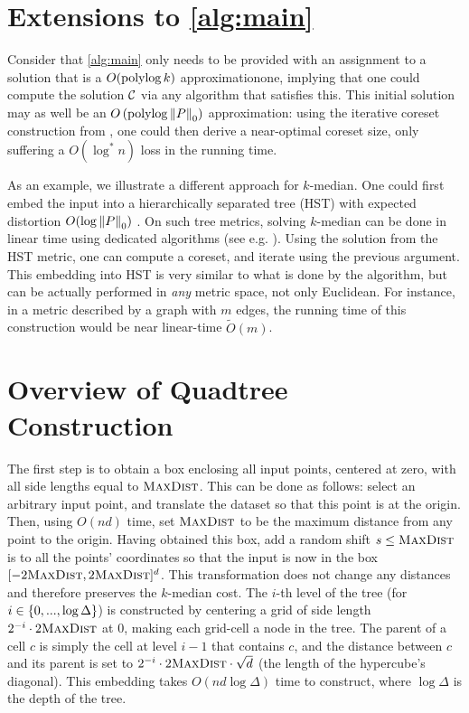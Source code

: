 \section{Extensions to \cref{alg:main}} 
\label{app:extensions}
Consider that \cref{alg:main}  only needs to be provided with an assignment to a solution that is a $O(\operatorname{polylog} k)$ approximationone, implying that one could
compute the solution $\mathcal C$ via any algorithm that satisfies this.  This initial solution may as well be an $O\left(\operatorname{polylog} \left\| P \right\|_0 \right)$
approximation: using the iterative coreset construction from \cite{BravermanJKW21}, one could then derive a near-optimal coreset size, only suffering
a $O(\log^* n)$ loss in the running time.

As an example, we illustrate a different approach for $k$-median. One could first embed the input into a hierarchically separated tree (HST) with expected
distortion $O(\log \left\| P \right\|_0)$ \cite{FakcharoenpholRT03}. On such tree metrics, solving $k$-median can be done in linear time using dedicated algorithms
(see e.g. \cite{Cohen-AddadLNSS21}). Using the solution from the HST metric, one can compute a coreset, and iterate using the previous argument.  This embedding
into HST is very similar to what is done by the \fkmeans algorithm, but can be actually performed in \emph{any} metric space, not only Euclidean.  For instance,
in a metric described by a graph with $m$ edges, the running time of this construction would be near linear-time $\tilde O(m)$.

\section{Overview of Quadtree Construction}
\label{app:quadtree}

The first step is to obtain a box enclosing all input points, centered at zero, with all side lengths equal to
$\textsc{MaxDist}$. This can be done as follows: select an arbitrary input point, and translate the dataset so that this point is at the origin. Then, using
$O(nd)$ time, set $\textsc{MaxDist}$ to be the maximum distance from any point to the origin. Having obtained this box, add a random shift $s \leq \textsc{MaxDist}$ is to all the points'
coordinates so that the input is now in the box $[-2\textsc{MaxDist}, 2\textsc{MaxDist}]^d$. This transformation does not change any distances and therefore preserves the
$k$-median cost.  The $i$-th level of the tree (for $i \in \left\{ 0, ..., \log \Delta \right\}$) is constructed by centering a grid of side length $2^{-i} \cdot
2\textsc{MaxDist}$ at $0$, making each grid-cell a node in the tree.  The parent of a cell $c$ is simply the cell at level $i-1$ that contains $c$, and the distance
between $c$ and its parent is set to $2^{-i} \cdot 2\textsc{MaxDist} \cdot \sqrt{d}$ (the length of the hypercube's diagonal). This embedding takes $O(nd \log \Delta)$
time to construct, where $\log \Delta$ is the depth of the tree.

